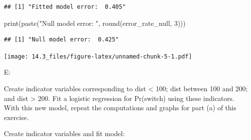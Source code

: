 \documentclass[
]{article}
\newenvironment{Shaded}{\begin{snugshade}}{\end{snugshade}}
\newcommand{\AttributeTok}[1]{\textcolor[rgb]{0.77,0.63,0.00}{#1}}
\newcommand{\DecValTok}[1]{\textcolor[rgb]{0.00,0.00,0.81}{#1}}
\newcommand{\FunctionTok}[1]{\textcolor[rgb]{0.00,0.00,0.00}{#1}}
\newcommand{\NormalTok}[1]{#1}
\newcommand{\OtherTok}[1]{\textcolor[rgb]{0.56,0.35,0.01}{#1}}
\newcommand{\SpecialCharTok}[1]{\textcolor[rgb]{0.00,0.00,0.00}{#1}}
\newcommand{\StringTok}[1]{\textcolor[rgb]{0.31,0.60,0.02}{#1}}
\begin{document}
\begin{verbatim}
## [1] "Fitted model error:  0.405"
\end{verbatim}

\begin{Shaded}
\begin{Highlighting}[]
\FunctionTok{print}\NormalTok{(}\FunctionTok{paste}\NormalTok{(}\StringTok{"Null model error: "}\NormalTok{, }\FunctionTok{round}\NormalTok{(error\_rate\_null, }\DecValTok{3}\NormalTok{)))}
\end{Highlighting}
\end{Shaded}

\begin{verbatim}
## [1] "Null model error:  0.425"
\end{verbatim}

\begin{Shaded}
\end{Shaded}

\texttt{[image: 14.3\_files/figure-latex/unnamed-chunk-5-1.pdf]}

E:

Create indicator variables corresponding to dist \textless{} 100; dist
between 100 and 200; and dist \textgreater{} 200. Fit a logistic
regression for Pr(switch) using these indicators. With this new model,
repeat the computations and graphs for part (a) of this exercise.

Create indicator variables and fit model:
\end{document}
